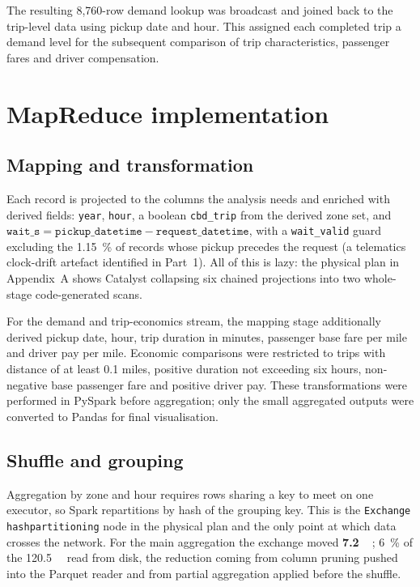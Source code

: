 \documentclass[10pt,a4paper]{article}
\begin{document}
The resulting 8,760-row demand lookup was broadcast and joined back
to the trip-level data using pickup date and hour. This assigned each
completed trip a demand level for the subsequent comparison of trip
characteristics, passenger fares and driver compensation.

\section{MapReduce implementation}

\subsection{Mapping and transformation}
Each record is projected to the columns the analysis needs and enriched with
derived fields: \texttt{year}, \texttt{hour}, a boolean \texttt{cbd\_trip} from
the derived zone set, and
$\texttt{wait\_s} = \texttt{pickup\_datetime} - \texttt{request\_datetime}$, with
a \texttt{wait\_valid} guard excluding the \SI{1.15}{\percent} of records whose
pickup precedes the request (a telematics clock-drift artefact identified in
Part~1). All of this is lazy: the physical plan in Appendix~A shows Catalyst
collapsing six chained projections into two whole-stage code-generated scans.

For the demand and trip-economics stream, the mapping stage
additionally derived pickup date, hour, trip duration in minutes,
passenger base fare per mile and driver pay per mile. Economic
comparisons were restricted to trips with distance of at least
0.1 miles, positive duration not exceeding six hours, non-negative
base passenger fare and positive driver pay. These transformations
were performed in PySpark before aggregation; only the small
aggregated outputs were converted to Pandas for final visualisation.

\subsection{Shuffle and grouping}
Aggregation by zone and hour requires rows sharing a key to meet on one
executor, so Spark repartitions by hash of the grouping key. This is the
\texttt{Exchange hashpartitioning} node in the physical plan and the only point
at which data crosses the network. For the main aggregation the exchange moved
\textbf{\SI{7.2}{\gibi\byte}}; \SI{6}{\percent} of the \SI{120.5}{\gibi\byte}
read from disk, the reduction coming from column pruning pushed into the Parquet
reader and from partial aggregation applied before the shuffle.
\end{document}
